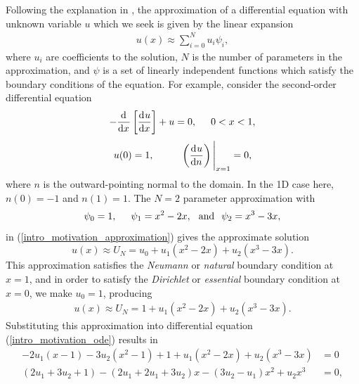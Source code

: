 Following the explanation in \citet{reddy_1993}, the approximation of a differential equation with unknown variable $u$ which we seek is given by the linear expansion
\begin{align}
  \label{intro_motivation_approximation}
  u(x) \approx \sum_{i=0}^N u_i \psi_i,
\end{align}
where $u_i$ are coefficients to the solution, $N$ is the number of parameters in the approximation, and $\psi$ is a set of linearly independent functions which satisfy the boundary conditions of the equation.  For example, consider the second-order differential equation
\begin{align}
  \label{intro_motivation_ode}
  - \frac{\mathrm{d}^{} }{\mathrm{d} x^{} } \left[ \frac{\mathrm{d}^{} u}{\mathrm{d} x^{} } \right] + u = 0, \hspace{5mm} 0 < x < 1,
\end{align}
\begin{align}
  \label{intro_motivation_bcs}
  u(0) = 1, \hspace{10mm} \left( \totder{u}{n} \right) \Bigg|_{x=1} = 0,
\end{align}
where $n$ is the outward-pointing normal to the domain.  In the 1D case here, $n(0) = -1$ and $n(1) = 1$.  The $N=2$ parameter approximation with
\begin{align*}
  \psi_0 = 1, \hspace{5mm} \psi_1 = x^2 - 2x, \hspace{2.5mm} \text{and} \hspace{2.5mm} \psi_2 = x^3 - 3x,
\end{align*}
in (\ref{intro_motivation_approximation}) gives the approximate solution
$$u(x) \approx U_N = u_0 + u_1 (x^2 - 2x) + u_2 (x^3 - 3x).$$
This approximation satisfies the \emph{Neumann} or \emph{natural} boundary condition
 
at $x=1$, and in order to satisfy the \emph{Dirichlet} or \emph{essential} boundary condition at $x=0$, we make $u_0 = 1$, producing
\begin{align}
  \label{intro_motivation_expansion}
  u(x) \approx U_N = 1 + u_1 (x^2 - 2x) + u_2 (x^3 - 3x).
\end{align}
Substituting this approximation into differential equation (\ref{intro_motivation_ode}) results in
{\footnotesize
\begin{align*}
  - 2u_1(x - 1) - 3u_2(x^2 - 1) + 1 + u_1(x^2 - 2x) + u_2 (x^3 - 3x) &= 0 \\
  (2u_1 + 3u_2 + 1) - (2u_1 + 2u_1 + 3u_2)x - (3u_2 - u_1)x^2 + u_2x^3 &= 0,
\end{align*}}
